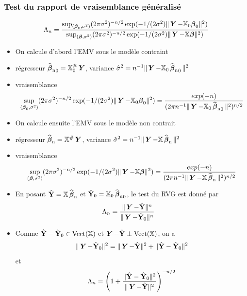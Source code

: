 \begin{frame}
\frametitle{Test du rapport de vraisemblance généralisé}
\[
\Lambda_n = \frac{\sup_{(\truebeta_0,\sigma^2)} (2 \pi \sigma^2)^{-n/2} \exp(-1/(2\sigma^2) \| \bY - \regressmat_0 \truebeta_0\|^2)}{\sup_{(\truebeta,\sigma^2)} (2 \pi \sigma^2)^{-n/2} \exp(-1/(2\sigma^2) \| \bY - \regressmat \truebeta\|^2)}
\]
{
\begin{itemize}
\item On calcule d'abord l'EMV sous le modèle contraint
\item \alert{régresseur} $\estregress_0= \regressmat_0^{\#} \bY$, \alert{variance} $\hat{\sigma}^2= n^{-1} \| \bY - \regressmat_0 \estregress_0\|^2$
\item \alert{vraisemblance}
\[
\sup_{(\truebeta_0,\sigma^2)} (2 \pi \sigma^2)^{-n/2} \exp(-1/(2\sigma^2) \| \bY - \regressmat_0 \truebeta_0\|^2)
= \frac{exp(-n)}{(2 \pi n^{-1} \| \bY - \regressmat_0 \estregress_0\|^2)^{n/2}}
\]
\end{itemize}
}
{
\begin{itemize}
\item On calcule ensuite l'EMV sous le modèle non contrait
\item \alert{régresseur} $\estregress= \regressmat^{\#} \bY$, \alert{variance} $\hat{\sigma}^2= n^{-1} \| \bY - \regressmat \estregress\|^2$
\item \alert{vraisemblance}
\[
\sup_{(\truebeta,\sigma^2)} (2 \pi \sigma^2)^{-n/2} \exp(-1/(2\sigma^2) \| \bY - \regressmat \truebeta\|^2)
= \frac{exp(-n)}{(2 \pi n^{-1} \| \bY - \regressmat \estregress \|^2)^{n/2}}
\]
\end{itemize}
}
{
\begin{itemize}
\item En posant $\predY= \regressmat \estregress$ et $\predY_0= \regressmat_0 \estregress_0$, le test du RVG est donné par
\begin{align*}
\Lambda_n &= \frac{\| \bY - \predY \|^n}{\| \bY - \predY_0 \|^n}
\end{align*}
\item Comme $\predY - \predY_0 \in \vect(\regressmat)$ et $\bY - \predY \perp \vect(\regressmat)$, on a
\[
\| \bY - \predY_0 \|^2 = \|\bY - \predY \|^2 + \| \predY - \predY_0 \|^2
\]
et
\[
\Lambda_n = \left( 1 + \frac{\|\predY - \predY_0\|^2}{\| \bY - \predY\|^2} \right)^{-n/2}
\]
\end{itemize}
}
\end{frame}


